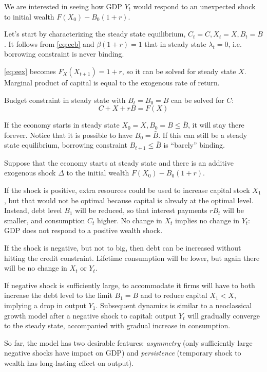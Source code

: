 \documentclass{article}
\begin{document}
We are interested in seeing how GDP $Y_t$ would respond to an
unexpected shock to initial wealth $F(X_0)-B_0(1+r)$.

Let's start by characterizing the steady state equilibrium,
$C_t=C,X_t=X,B_t=B$. It follows from \eqref{eq:eeb} and $\beta(1+r)=1$
that in steady state $\lambda_t=0$, i.e. borrowing constraint is never
binding.

\eqref{eq:eex} becomes $F_X(X_{t+1})=1+r$, so it can be solved for
steady state $X$. Marginal product of capital is equal to the
exogenous rate of return.

Budget constraint in steady state with $B_t=B_0=B$ can be solved for $C$:
\begin{equation*}
C+X+rB=F(X)
\end{equation*}
  
If the economy starts in steady state $X_0=X,B_0=B\le\bar{B}$, it will
stay there forever. Notice that it is possible to have
$B_0=\bar{B}$. If this can still be a steady state equilibrium,
borrowing constraint $B_{t+1}\le\bar{B}$ is ``barely'' binding.

Suppose that the economy starts at steady state and there is an
additive exogenous shock $\Delta$ to the initial wealth
$F(X_0)-B_0(1+r)$.

If the shock is positive, extra resources could be used to increase
capital stock $X_1$, but that would not be optimal because capital is
already at the optimal level. Instead, debt level $B_1$ will be
reduced, so that interest payments $rB_t$ will be smaller, and
consumption $C_t$ higher. No change in $X_t$ implies no change in
$Y_t$: GDP does not respond to a positive wealth shock.

If the shock is negative, but not to big, then debt can be increased
without hitting the credit constraint. Lifetime consumption will be
lower, but again there will be no change in $X_t$ or $Y_t$.

If negative shock is sufficiently large, to accommodate it firms will
have to both increase the debt level to the limit $B_1=\bar{B}$ and to
reduce capital $X_1<X$, implying a drop in output $Y_1$. Subsequent
dynamics is similar to a neoclassical growth model after a negative
shock to capital: output $Y_t$ will gradually converge to the steady
state, accompanied with gradual increase in consumption.

So far, the model has two desirable features: \emph{asymmetry} (only
sufficiently large negative shocks have impact on GDP) and
\emph{persistence} (temporary shock to wealth has long-lasting effect
on output).
\end{document}
